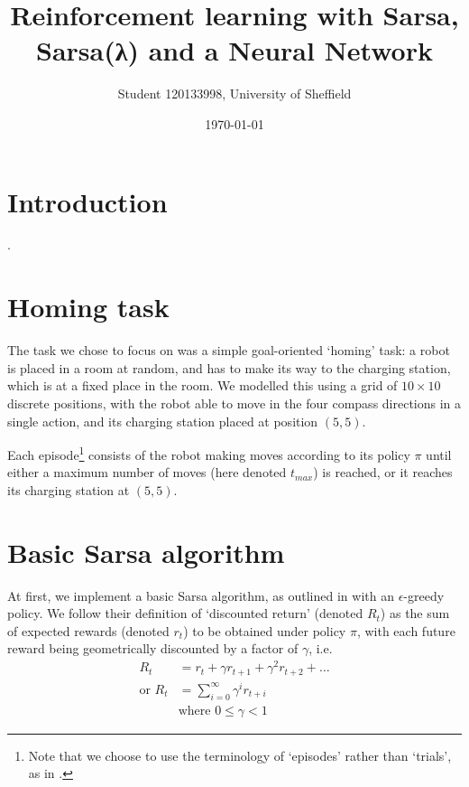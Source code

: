 \documentclass[a4paper, 11pt, twocolumn, final]{article} %
\title{Reinforcement learning with Sarsa, Sarsa(λ) and a Neural Network}
\author{Student 120133998, University of Sheffield}
\date{\today}
\begin{document}

\section{Introduction} .

\section{Homing task} The task we chose to focus on was a simple goal-oriented
`homing' task: a robot is placed in a room at random, and has to make its way to
the charging station, which is at a fixed place in the room.  We modelled this
using a grid of $10\times10$ discrete positions, with the robot able to move in
the four compass directions in a single action, and its charging station placed
at position $(5, 5)$.

Each episode\footnote{Note that we choose to use the terminology of `episodes'
rather than `trials', as in \cite[p.~58]{Sutton1998}.} consists of the robot
making moves according to its policy $\pi$ until either a maximum number of
moves (here denoted $t_{max}$) is reached, or it reaches its charging station at
$(5, 5)$.

\section{Basic Sarsa algorithm} At first, we implement a basic Sarsa algorithm, as
outlined in \cite[Chapter~6]{Sutton1998} with an $\epsilon$-greedy policy.  We
follow their definition of `discounted return' (denoted $R_t$) as the sum of
expected rewards (denoted $r_t$) to be obtained under policy $\pi$, with each
future reward being geometrically discounted by a factor of $\gamma$, i.e.
\begin{align}
R_t &= r_t + \gamma r_{t+1} + \gamma^2 r_{t+2} + \ldots \nonumber \\
\text{or } R_t &= \sum_{i=0}^{\infty}{\gamma^ir_{t+i}} \\
&\text{where }0 \le \gamma < 1 \nonumber
\end{align}
\end{document}
